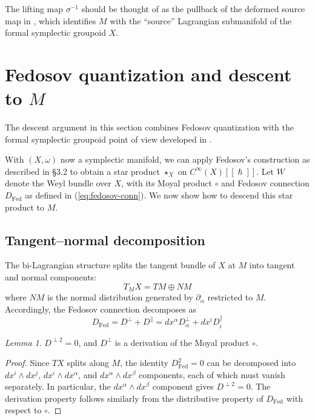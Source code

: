\documentclass[
  12pt,
  a4paper, oneside
]{report}
\renewcommand{\hbar}{\hslash}
\theoremstyle{bolddef}
\theoremstyle{remark}
\newtheorem{lemma}[theorem]{Lemma}
\numberwithin{equation}{chapter}
\begin{document}
The lifting map $\sigma^{-1}$ should be thought of as the pullback of the deformed source map in \cite{CDF}, which identifies $M$ with the ``source'' Lagrangian submanifold of the formal symplectic groupoid $X$.


\section*{Fedosov quantization and descent to $M$}
The descent argument in this section combines Fedosov quantization with the formal symplectic groupoid point of view developed in \cite{Fedosov1994,CDF}.


With $(X, \omega)$ now a symplectic manifold, we can apply Fedosov's construction as described in \S 3.2 to obtain a star product $\star_X$ on $C^\infty(X)[[\hbar]]$. Let $W$ denote the Weyl bundle over $X$, with its Moyal product $\circ$ and Fedosov connection $D_{\mathrm{Fed}}$ as defined in (\ref{eq:fedosov-conn}). We now show how to descend this star product to $M$.

\subsection*{Tangent--normal decomposition}

The bi-Lagrangian structure splits the tangent bundle of $X$ at $M$ into tangent and normal components:
\[
T_M X = TM \oplus NM
\]
where $NM$ is the normal distribution generated by $\partial_\alpha$ restricted to $M$. Accordingly, the Fedosov connection decomposes as
\begin{equation}\label{eq:fed-decomp}
D_{\mathrm{Fed}} = D^\perp + D^\parallel = dx^\alpha D^\perp_\alpha + dx^i D^\parallel_i
\end{equation}

\begin{lemma}\label{lem:Dperp-props}
$D^{\perp 2} = 0$, and $D^\perp$ is a derivation of the Moyal product $\circ$.
\end{lemma}
\begin{proof}
Since $TX$ splits along $M$, the identity $D_{\mathrm{Fed}}^2 = 0$ can be decomposed into $dx^i \wedge dx^j$, $dx^i \wedge dx^\alpha$, and $dx^\alpha \wedge dx^\beta$ components, each of which must vanish separately. In particular, the $dx^\alpha \wedge dx^\beta$ component gives $D^{\perp 2} = 0$. The derivation property follows similarly from the distributive property of $D_{\mathrm{Fed}}$ with respect to $\circ$.
\end{proof}
\end{document}

